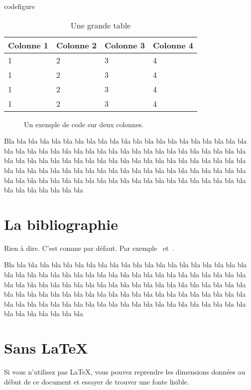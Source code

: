 \documentclass[twocolumn]{article}
\begin{document}
\begin{SaveVerbatim}{codefigure}
  \begin{table*}[t]
    \centering
    \begin{tabular}{|l|l|l|l|}
      \hline
      \textbf{Colonne 1} & \textbf{Colonne 2} & \textbf{Colonne 3} &
      \textbf{Colonne 4} \\ \hline
      1 & 2 & 3 & 4 \\ 
      1 & 2 & 3 & 4 \\ 
      1 & 2 & 3 & 4 \\ 
      1 & 2 & 3 & 4 \\ \hline
    \end{tabular}
    \caption{Une grande table}
    \label{tab:tab}
  \end{table*}
\end{SaveVerbatim}


\begin{figure*}[t]
  \centering
  \caption{Un exemple de code sur deux colonnes.}
  \label{fig:code}
\end{figure*}
Bla bla bla bla bla bla bla bla bla bla bla bla bla bla bla bla bla
bla bla bla bla bla bla bla bla bla bla bla bla bla bla bla bla bla
bla bla bla bla bla bla bla bla bla bla bla bla bla bla bla bla bla
bla bla bla bla bla bla bla bla bla bla bla bla bla bla bla bla bla
bla bla bla bla bla bla bla bla bla bla bla bla bla bla bla bla bla
bla bla bla bla bla bla bla bla bla bla bla bla bla bla bla bla bla
bla bla bla bla bla bla bla bla bla bla



\section{La bibliographie}
\label{sec:la-bibliographie}

Rien à dire. C'est comme par défaut. Par exemple~\cite{papier1} et~\cite{papier2}.

Bla bla bla bla bla bla bla bla bla bla bla bla bla bla bla bla bla
bla bla bla bla bla bla bla bla bla bla bla bla bla bla bla bla bla
bla bla bla bla bla bla bla bla bla bla bla bla bla bla bla bla bla
bla bla bla bla bla bla bla bla bla bla bla bla bla bla bla bla bla
bla bla bla bla bla bla bla bla bla bla bla bla bla bla bla bla bla
bla bla bla bla bla bla bla bla bla bla bla bla bla bla bla bla bla
bla bla bla bla bla bla bla bla bla bla

\section{Sans \LaTeX}
\label{sec:sans-latex}

Si vous n'utilisez pas \LaTeX, vous pouvez reprendre les dimensions
données au début de ce document et essayer de trouver une fonte
lisible. 


\end{document}
